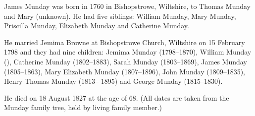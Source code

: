 
James Munday was born in 1760  in Bishopstrowe, Wiltshire, to Thomas Munday and Mary (unknown). He had five siblings:
William Munday,  Mary Munday, Priscilla Munday, Elizabeth Munday and Catherine Munday.

He married Jemima Browne at Bishopstrowe Church, Wiltshire on 15 February 1798 and they had nine children: Jemima Munday (1798--1870), William Munday (), Catherine Munday (1802--1883), Sarah Munday (1803--1869),
James Munday (1805--1863), Mary Elizabeth Munday (1807--1896), John Munday (1809--1835), Henry Thomas Munday (1813-- 1895) and George Munday (1815--1830).

He died on 18 August 1827 at the age of 68.
(All dates are taken from the Munday family tree, held by living family member.)
